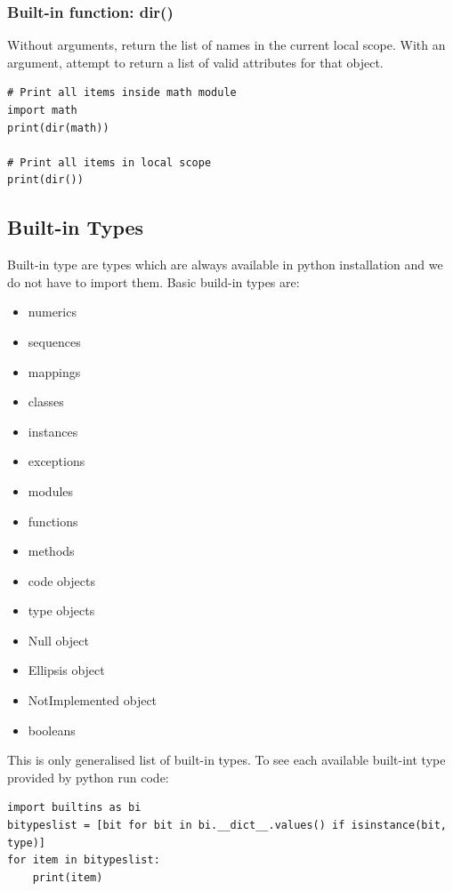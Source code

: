 \documentclass{article}
\begin{document}
	\subsubsection{Built-in function: dir()}
Without arguments, return the list of names in the current local scope. With an argument, attempt to return a list of valid attributes for that object.
	\begin{lstlisting}[style=pystyle]
# Print all items inside math module
import math
print(dir(math))

# Print all items in local scope
print(dir())
	\end{lstlisting}



	\newpage
	\subsection{Built-in Types}
	Built-in type are types which are always available in python installation and we do not have to import them. Basic build-in types are:
	\begin{itemize}
	\item numerics
	\item sequences
	\item mappings
	\item classes
	\item instances
	\item exceptions
	\item modules
	\item functions
	\item methods
	\item code objects
	\item type objects
	\item Null object
	\item Ellipsis object
	\item NotImplemented object
	\item booleans
	\end{itemize}
	This is only generalised list of built-in types. To see each available built-int type provided by python run code:
	\begin{lstlisting}[style=pystyle]
import builtins as bi
bitypeslist = [bit for bit in bi.__dict__.values() if isinstance(bit, type)]
for item in bitypeslist:
    print(item)
	\end{lstlisting}
	
\end{document}
